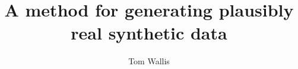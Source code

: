 \title{A method for generating plausibly real synthetic data}
\author{Tom Wallis}
\date{}


\usepackage{indentfirst}
\usepackage[obeyDraft,textsize=small]{todonotes}
